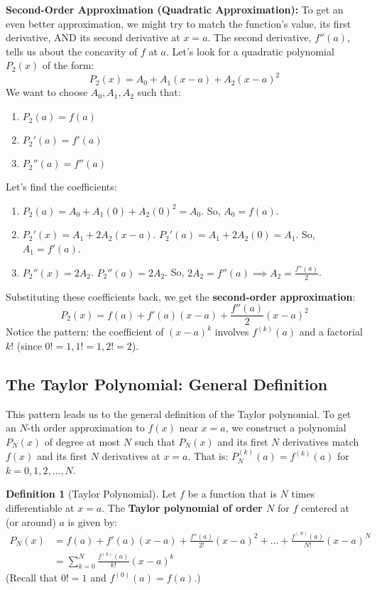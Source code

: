 \documentclass[11pt, a4paper]{article}
\theoremstyle{plain}
\theoremstyle{definition}
\newtheorem{definition}[theorem]{Definition}
\theoremstyle{remark}
\begin{document}
\textbf{Second-Order Approximation (Quadratic Approximation):}
To get an even better approximation, we might try to match the function's value, its first derivative, AND its second derivative at $x=a$. The second derivative, $f''(a)$, tells us about the concavity of $f$ at $a$.
Let's look for a quadratic polynomial $P_2(x)$ of the form:
\[ P_2(x) = A_0 + A_1(x-a) + A_2(x-a)^2 \]
We want to choose $A_0, A_1, A_2$ such that:
\begin{enumerate}
    \item $P_2(a) = f(a)$
    \item $P_2'(a) = f'(a)$
    \item $P_2''(a) = f''(a)$
\end{enumerate}
Let's find the coefficients:
\begin{enumerate}
    \item $P_2(a) = A_0 + A_1(0) + A_2(0)^2 = A_0$. So, $A_0 = f(a)$.
    \item $P_2'(x) = A_1 + 2A_2(x-a)$.
          $P_2'(a) = A_1 + 2A_2(0) = A_1$. So, $A_1 = f'(a)$.
    \item $P_2''(x) = 2A_2$.
          $P_2''(a) = 2A_2$. So, $2A_2 = f''(a) \implies A_2 = \frac{f''(a)}{2}$.
\end{enumerate}
Substituting these coefficients back, we get the \textbf{second-order approximation}:
\[ P_2(x) = f(a) + f'(a)(x-a) + \frac{f''(a)}{2}(x-a)^2 \]
Notice the pattern: the coefficient of $(x-a)^k$ involves $f^{(k)}(a)$ and a factorial $k!$ (since $0!=1, 1!=1, 2!=2$).

\subsection{The Taylor Polynomial: General Definition}

This pattern leads us to the general definition of the Taylor polynomial.
To get an $N$-th order approximation to $f(x)$ near $x=a$, we construct a polynomial $P_N(x)$ of degree at most $N$ such that $P_N(x)$ and its first $N$ derivatives match $f(x)$ and its first $N$ derivatives at $x=a$. That is:
$P_N^{(k)}(a) = f^{(k)}(a)$ for $k = 0, 1, 2, \dots, N$.

\begin{definition}[Taylor Polynomial]
Let $f$ be a function that is $N$ times differentiable at $x=a$. The \textbf{Taylor polynomial of order $N$} for $f$ centered at (or around) $a$ is given by:
\begin{align*}
P_N(x) &= f(a) + f'(a)(x-a) + \frac{f''(a)}{2!}(x-a)^2 + \dots + \frac{f^{(N)}(a)}{N!}(x-a)^N \\
       &= \sum_{k=0}^{N} \frac{f^{(k)}(a)}{k!}(x-a)^k
\end{align*}
(Recall that $0! = 1$ and $f^{(0)}(a) = f(a)$.)
\end{definition}
\end{document}
